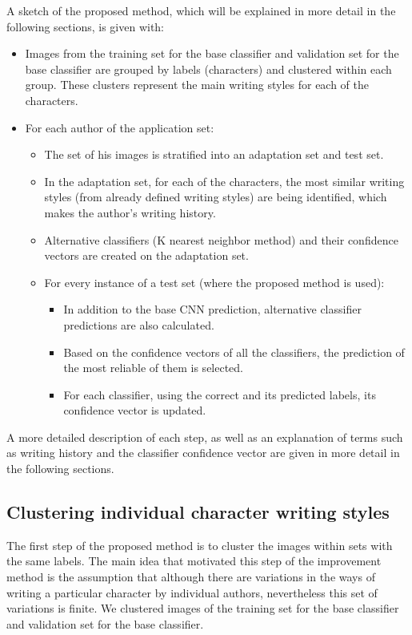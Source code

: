 \documentclass{article}
\begin{document}
A sketch of the proposed method, which will be explained in more detail in the following sections, is given with:
\begin{itemize}
  \item Images from the training set for the base classifier and validation set for the base classifier are grouped by labels (characters) and clustered within each group.
  These clusters represent the main writing styles for each of the characters.
  \item For each author of the application set:
  \begin{itemize}
    \item The set of his images is stratified into an adaptation set and test set.
    \item In the adaptation set, for each of the characters, the most similar writing styles (from already defined writing styles) are being identified, which makes the author's writing history.
    \item Alternative classifiers (K nearest neighbor method) and their confidence vectors are created on the adaptation set.
    \item For every instance of a test set (where the proposed method is used):
      \begin{itemize}
        \item In addition to the base CNN prediction, alternative classifier predictions are also calculated.
        \item Based on the confidence vectors of all the classifiers, the prediction of the most reliable of them is selected.
        \item For each classifier, using the correct and its predicted labels, its confidence vector is updated.
      \end{itemize}
  \end{itemize}
\end{itemize}
A more detailed description of each step, as well as an explanation of terms such as writing history and the classifier confidence vector are given in more detail in the following sections.

\subsection{Clustering individual character writing styles}

The first step of the proposed method is to cluster the images within sets with the same labels.
The main idea that motivated this step of the improvement method is the assumption that although there are variations in the ways of writing a particular character by individual authors, nevertheless this set of variations is finite.
We clustered images of the training set for the base classifier and validation set for the base classifier.
\end{document}
